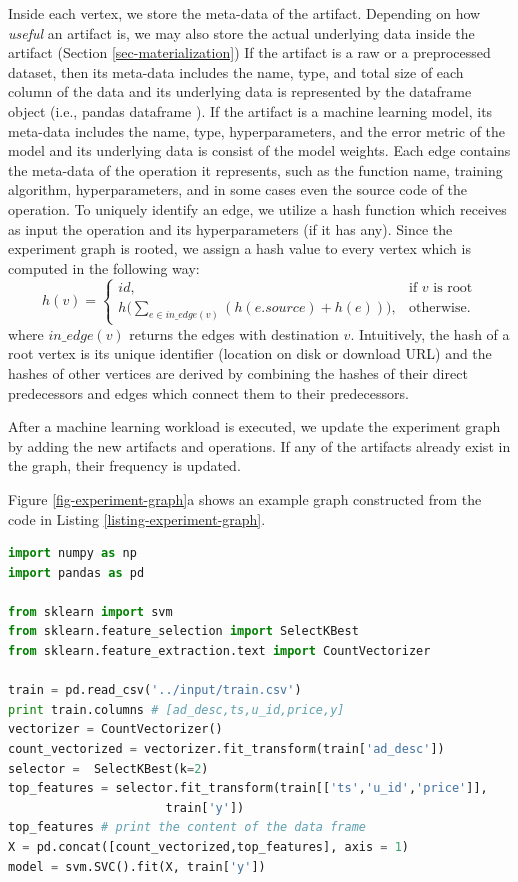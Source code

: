 Inside each vertex, we store the meta-data of the artifact.
Depending on how \textit{useful} an artifact is, we may also store the actual underlying data inside the artifact (Section \ref{sec-materialization})
If the artifact is a raw or a preprocessed dataset, then its meta-data includes the name, type, and total size of each column of the data and its underlying data is represented by the dataframe object (i.e., pandas dataframe \cite{mckinney-proc-scipy-2010}). 
If the artifact is a machine learning model, its meta-data includes the name, type, hyperparameters, and the error metric of the model and its underlying data is consist of the model weights.
Each edge contains the meta-data of the operation it represents, such as the function name, training algorithm, hyperparameters, and in some cases even the source code of the operation.
To uniquely identify an edge, we utilize a hash function which receives as input the operation and its hyperparameters (if it has any).
Since the experiment graph is rooted, we assign a hash value to every vertex which is computed in the following way:
\[
    h(v)= 
\begin{cases}
    id,& \text{if } v \text{ is root}\\
    h\Big(\sum\limits_{e \in in\_edge(v)} (h(e.source) + h(e) ) \Big)  ,              & \text{otherwise}.
\end{cases}
\]
where $in\_edge(v)$ returns the edges with destination $v$. 
Intuitively, the hash of a root vertex is its unique identifier (location on disk or download URL) and the hashes of other vertices are derived by combining the hashes of their direct predecessors and edges which connect them to their predecessors.

After a machine learning workload is executed, we update the experiment graph by adding the new artifacts and operations.
If any of the artifacts already exist in the graph, their frequency is updated.

Figure \ref{fig-experiment-graph}a shows an example graph constructed from the code in Listing \ref{listing-experiment-graph}.

\begin{lstlisting}[language=Python, caption=Example script,captionpos=b,label = {listing-experiment-graph}]
import numpy as np
import pandas as pd

from sklearn import svm
from sklearn.feature_selection import SelectKBest
from sklearn.feature_extraction.text import CountVectorizer

train = pd.read_csv('../input/train.csv') 
print train.columns # [ad_desc,ts,u_id,price,y]
vectorizer = CountVectorizer()
count_vectorized = vectorizer.fit_transform(train['ad_desc'])
selector =  SelectKBest(k=2)
top_features = selector.fit_transform(train[['ts','u_id','price']], 
				      train['y'])
top_features # print the content of the data frame			     
X = pd.concat([count_vectorized,top_features], axis = 1)
model = svm.SVC().fit(X, train['y'])
\end{lstlisting}

